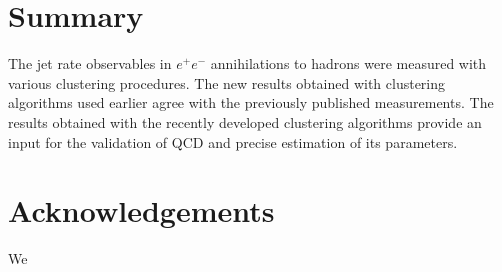 \section{Summary}                      
\label{sec:summary}
The jet rate observables  in $e^+e^-$ 
annihilations to hadrons were measured with various clustering procedures.
The new results obtained with 
clustering algorithms  used earlier agree with the previously published measurements.
The results obtained with the recently developed clustering algorithms  
provide an input for the validation of QCD and precise estimation of its parameters.
%
\section*{Acknowledgements}
\label{sec:acknowledgements}
We
\FloatBarrier
